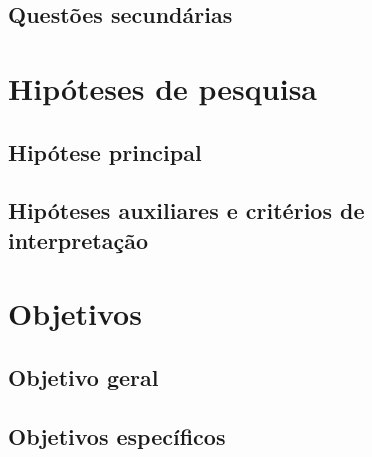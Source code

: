 \subsection{Questões secundárias}

\section{Hipóteses de pesquisa}

\subsection{Hipótese principal}

\subsection{Hipóteses auxiliares e critérios de interpretação}

\section{Objetivos}

\subsection{Objetivo geral}

\subsection{Objetivos específicos}

